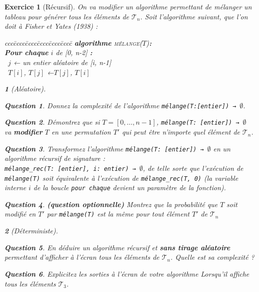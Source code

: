 \documentclass{article}
\theoremstyle{exostyle}
\newtheorem{exo}{Exercice}
\theoremstyle{partiestyle}
\newtheorem{partie}{}[exo]
\theoremstyle{questionstyle}
\newtheorem{questionpartie}{Question}[partie]
\begin{document}
\begin{exo}[Récursif]
    On va modifier un algorithme permettant de mélanger un tableau pour générer tous les éléments de $\mathcal{T}_n$. Soit l'algorithme suivant, que l'on doit à Fisher et Yates (1938) :
        \begin{tabbing}
            ccc\=cccc\=cccc\=cccc\=cccc\=cccc\=\kill
            \textbf{algorithme} \textsc{mélange}($T$){\bf :}\\
            \>\textbf{Pour chaque} $i$ de [0, n-2] {\bf :}\\
            \> \>\vline $\,$ $j$ ← un entier aléatoire de [i, n-1] \\
            \> \>\vline $\,$ $T[i]$, $T[j]$ ←$T[j]$, $T[i]$
        \end{tabbing}

    \begin{partie}[Aléatoire]
        \begin{questionpartie}
            Donnez la complexité de l'algorithme \verb|mélange(T:[entier]) → |$\emptyset$.
        \end{questionpartie}
        \begin{questionpartie}
            Démontrez que si $T=[0, \dots, n-1]$, \verb|mélange(T: [entier]) → |$\emptyset$ va {\bf modifier} $T$ en une permutation $T'$ qui peut être n'importe quel élément de $\mathcal{T}_n$.
        \end{questionpartie}
        \begin{questionpartie}
            Transformez l'algorithme \verb|mélange(T: [entier]) → |$\emptyset$ en un algorithme récursif de signature :\\ \verb|mélange_rec(T: [entier], i: entier) → |$\emptyset$, de telle sorte que l'exécution de \verb|mélange(T)| soit équivalente à l'exécution de \verb|mélange_rec(T, 0)| (la variable interne $i$ de la boucle \verb|pour chaque| devient un paramètre de la fonction). 
        \end{questionpartie}
        \begin{questionpartie}
        {\em\bf (question optionnelle)} Montrez que la probabilité que $T$ soit modifié en $T'$ par \verb|mélange(T)| est la même pour tout élément $T'$ de $\mathcal{T}_n$
        \end{questionpartie}

        \end{partie}
        \begin{partie}[Déterministe]
        \begin{questionpartie}
            En déduire un algorithme récursif et {\bf sans tirage aléatoire} permettant d'afficher à l'écran tous les éléments de $\mathcal{T}_n$. Quelle est sa complexité ?
        \end{questionpartie}
        \begin{questionpartie}
            Explicitez les sorties à l'écran de votre algorithme Lorsqu'il affiche tous les éléments $\mathcal{T}_3$.
        \end{questionpartie}

    \end{partie}
\end{exo}
\end{document}
